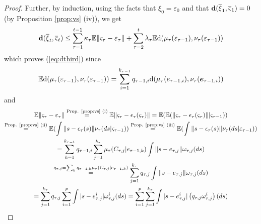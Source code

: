 \documentclass{article}              %
\begin{document}
\begin{proof}
Further, by induction, 
using the facts that $\xi_{0}=\varepsilon_{0}$ and that $\mathbf{d}(\overline{\xi}_{1},\overline{\varsigma}_{1})=0$
(by Proposition \ref{prop:vs} (iv)), we get
\[
\mathbf{d}(\overline{\xi}_{t},\overline{\varsigma}_{t})\leq\sum_{\tau=1}^{t-1}\kappa_{\tau}\mathbb{E}\|\varsigma_{\tau}-\varepsilon_{\tau}\|+\sum_{\tau=2}^{t}\lambda_{\tau}\mathbb{E}\mathrm{d}(\mu_{\tau}(\varepsilon_{\text{\ensuremath{\tau}}-1}),\nu_{\tau}(\varepsilon_{\tau-1}))
\]
which proves (\ref{eq:dthird}) since 
\[
\mathbb{E}\mathrm{d}(\mu_{\tau}(\varepsilon_{\text{\ensuremath{\tau}}-1}),\nu_{\tau}(\varepsilon_{\tau-1}))=\sum_{i=1}^{k_{\tau-1}}q_{\tau-1,i}\mathrm{d}(\mu_{\tau}(e_{\text{\ensuremath{\tau}}-1,i}),\nu_{\tau}(\boldsymbol{e}_{\tau-1,i}))
\]
and  
\begin{multline*}
\mathbb{E}\|\varsigma_{\tau}-\varepsilon_{\tau}\|\stackrel{\text{Prop. \ref{prop:vs} (i)}}{=}\mathbb{E}\|\varsigma_{\tau}-\epsilon_{\tau}(\varsigma_{\tau})\|=\mathbb{E}(\mathbb{E}(\|\varsigma_{\tau}-\epsilon_{\tau}(\varsigma_{\tau})\||\varsigma_{\tau-1}))\\
\stackrel{\text{Prop. \ref{prop:vs} (ii)}}{=}\mathbb{E}(\int\|s-\epsilon_{\tau}(s)\|\nu_{\tau}(ds|\varsigma_{\tau-1}))\stackrel{\text{Prop. \ref{prop:vs} (iii)}}{=}\mathbb{E}(\int\|s-\epsilon_{\tau}(s)\|\nu_{\tau}(ds|\varepsilon_{\tau-1}))\\
=\sum_{k=1}^{k_{\tau-1}}q_{\tau-1,i}\sum_{j=1}^{k_{\tau}}\mu_{\tau}(C_{\tau,j}|e_{\tau-1,k})\int\|s-e_{\tau,j}\|\omega_{\tau,j}(ds)\\
\stackrel{q_{\tau,j}=\sum_{k}q_{\tau-1,k}\mu_{\tau}(C_{\tau,j}|e_{\tau-1,k})}{=}\sum_{j=1}^{k_{\tau}}q_{\tau,j}\int\|s-e_{\tau,j}\|\omega_{\tau,j}(ds)\\
=\sum_{j=1}^{k_{\tau}}q_{\tau,j}\sum_{i=1}^{p}\int|s-e_{\tau,j}^{i}|\omega_{\tau,j}^{i}(ds)=\sum_{i=1}^{p}\sum_{j=1}^{k_{\tau}}\int|s-e_{\tau,j}^{i}|\left(q_{\tau,j}\omega_{\tau,j}^{i}\right)(ds)
\end{multline*}
\end{proof}
\end{document}
